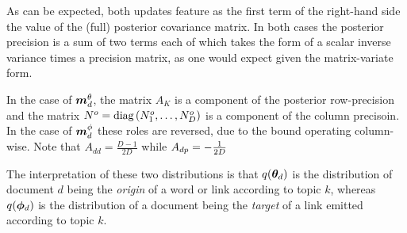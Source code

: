 As can be expected, both updates feature as the first term of the right-hand side the value of the (full) posterior covariance matrix. In both cases the posterior precision is a sum of two terms each of which takes the form of a scalar inverse variance times a precision matrix, as one would expect given the matrix-variate form. 

In the case of ${ \bm m^{\theta}_d }$, the matrix $A_K$ is a component of the posterior row-precision and the matrix $N^o = \text{diag} \left( {N^o_1, \ldots, N^o_D} \right)$ is a component of the column precisoin. In the case of ${ \bm m^{\phi}_d }$ these roles are reversed, due to the bound operating column-wise. Note that $A_{dd} = \frac{D-1}{2D}$ while $A_{dp} = - \frac{1}{ {2D} }$

The interpretation of these two distributions is that $q({ \bm \theta_d })$ is the distribution of document $d$ being the \emph{origin} of a word or link according to topic $k$, whereas $q(\bm \phi_d)$ is the distribution of a document being the \emph{target} of a link emitted according to topic $k$.

